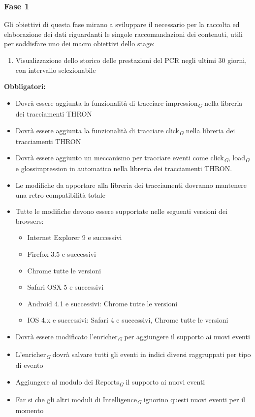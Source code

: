 \documentclass[a4paper, 12pt, twoside, openright]{book}
\newcommand{\gloss}[1]{#1\textsubscript{\textit{\tiny{G}}}}
\begin{document}
\subsubsection{Fase 1}
Gli obiettivi di questa fase mirano a sviluppare il necessario per la raccolta ed elaborazione dei dati riguardanti le singole raccomandazioni dei contenuti, utili per soddisfare uno dei macro obiettivi dello stage:
\begin{enumerate}
	\item Visualizzazione dello storico delle prestazioni del PCR negli ultimi 30 giorni, con intervallo selezionabile
\end{enumerate}
\textbf{Obbligatori:}
\begin{itemize}
\item Dovrà essere aggiunta la funzionalità di tracciare \gloss{impression} nella libreria dei tracciamenti THRON
\item Dovrà essere aggiunta la funzionalità di tracciare \gloss{click} nella libreria dei tracciamenti THRON
\item Dovrà essere aggiunto un meccanismo per tracciare eventi come \gloss{click}, \gloss{load} e gloss{impression} in automatico nella libreria dei tracciamenti THRON.
\item Le modifiche da apportare alla libreria dei tracciamenti dovranno mantenere una retro compatibilità totale
\item Tutte le modifiche devono essere supportate nelle seguenti versioni dei browsers:
	\begin{itemize}
	\item Internet Explorer 9 e successivi
	\item Firefox 3.5 e successivi
	\item Chrome tutte le versioni
	\item Safari OSX 5 e successivi
	\item Android 4.1 e successivi: Chrome tutte le versioni
	\item IOS 4.x e successivi: Safari 4 e successivi, Chrome tutte le versioni
	\end{itemize}
\item Dovrà essere modificato l'\gloss{enricher} per aggiungere il supporto ai nuovi eventi
\item L'\gloss{enricher} dovrà salvare tutti gli eventi in indici diversi raggruppati per tipo di evento
\item Aggiungere al modulo dei \gloss{Reports} il supporto ai nuovi eventi
\item Far si che gli altri \gloss{moduli di Intelligence} ignorino questi nuovi eventi per il momento
\end{itemize}
\end{document}
